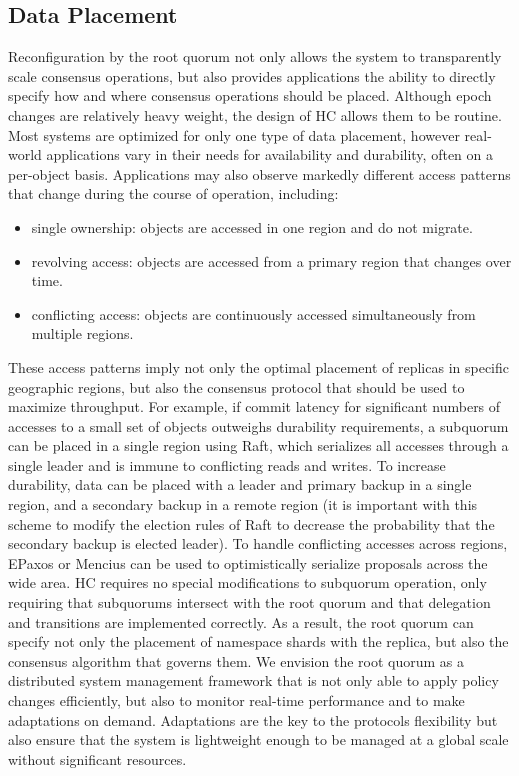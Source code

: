 \documentclass[10pt,conference]{IEEEtran}
\newcommand{\sub}{subquorum\xspace}
\newcommand{\subs}{subquorums\xspace}
\newcommand{\roo}{root quorum\xspace}
\begin{document}
\subsection{Data Placement}
\label{section:placement}


Reconfiguration by the \roo not only allows the system to transparently scale consensus
operations, but also provides applications the ability to directly specify how and where
consensus operations should be placed.
Although epoch changes are relatively heavy weight, the design of HC allows them to be
routine.
Most systems are optimized for only one type of data placement, however real-world
applications vary in their needs for availability and durability, often on a per-object
basis.
Applications may also observe markedly different access patterns that change during the
course of operation, including:

\begin{itemize}
    \item single ownership: objects are accessed in one region and do not migrate.
    \item revolving access: objects are accessed from a primary region that changes over time.
    \item conflicting access: objects are continuously accessed simultaneously from multiple regions.
\end{itemize}

These access patterns imply not only the optimal placement of replicas in specific
geographic regions, but also the consensus protocol that should be used to maximize
throughput.
For example, if commit latency for significant numbers of accesses to a small set of
objects outweighs durability requirements, a \sub can be placed in a single region using
Raft, which serializes all accesses through a single leader and is immune to conflicting
reads and writes.
To increase durability, data can be placed with a leader and primary backup in a single
region, and a secondary backup in a remote region (it is important with this scheme to
modify the election rules of Raft to decrease the probability that the secondary backup
is elected leader).
To handle conflicting accesses across regions, EPaxos or Mencius can be used to
optimistically serialize proposals across the wide area.
HC requires no special modifications to \sub operation, only requiring that \subs
intersect with the \roo and that delegation and transitions are implemented correctly.
As a result, the \roo can specify not only the placement of namespace shards with the
replica, but also the consensus algorithm that governs them.
We envision the \roo as a distributed system management framework that is not only able
to apply policy changes efficiently, but also to monitor real-time performance and to
make adaptations on demand.
Adaptations are the key to the protocols flexibility but also ensure that the system is
lightweight enough to be managed at a global scale without significant resources.
\end{document}
